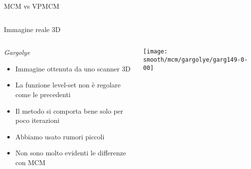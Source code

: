 \begin{frame}{MCM vs VPMCM}
 \begin{columns}[T]
  \begin{column}{5cm}
    \centering
    \end{column}
  \begin{column}[T]{5cm}
    \centering
    \end{column}
 \end{columns}
\begin{columns}[T]
  \begin{column}{5cm}
    \centering
    \end{column}
  \begin{column}[T]{5cm}
    \centering
    \end{column}
  \end{columns}
\end{frame}



\begin{frame}{Immagine reale 3D}
 \begin{columns}[T]
    \begin{column}{4cm}
      \begin{block}{\emph{Gargolye}}
        \begin{itemize}
        \item Immagine ottenuta da uno scanner 3D
        \item La funzione level-set non è regolare come le precedenti 
        \item Il metodo si comporta bene solo per poco iterazioni
        \item Abbiamo usato rumori piccoli
        \item Non sono molto evidenti le differenze con MCM
        \end{itemize}
      \end{block}
    \end{column}
   \begin{column}{6cm}
     \texttt{[image: smooth/mcm/gargolye/garg149-0-00]}
   \end{column}
  \end{columns}
\end{frame}

